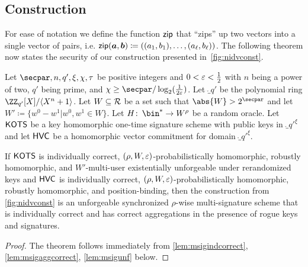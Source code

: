 \subsection{Construction}
For ease of notation we define the function $\mathsf{zip}$ that \enquote{zips} up two vectors into a single vector of pairs, i.e.
$
\mathsf{zip}(\boldsymbol{a},\boldsymbol{b}) \coloneqq ((a_1,b_1),\allowbreak\dots,\allowbreak(a_\ell,b_\ell))
$.
The following theorem now states the security of our construction presented in~\autoref{fig:nidvconst}.
\begin{theorem}\label{thm:mainconstruction}
Let $\secpar,n,q',\xi,\chi,\tau$ be positive integers and $0<\varepsilon < \tfrac{1}{2}$ with $n$ being a power of two, $q'$ being prime, and $\chi \geq \secpar/\log_2(\frac{1}{2\errorbound})$.
Let $\ring_{q'}$ be the polynomial ring $\defringqq$.
Let $W \subseteq \mathcal{R}$ be a set such that $\abs{W} > 2^\secpar$ and let $W' \coloneqq \{w^0-w^1| w^0,w^1 \in W\}$.
Let $H \colon\, \bin^* \to W^\rho$ be a random oracle.
Let $\mathsf{KOTS}$ be a key homomorphic one-time signature scheme with public keys in $\ring_{q'}^\xi$ and let $\mathsf{HVC}$ be a homomorphic vector commitment for domain $\ring_{q'}^\xi$.

If $\mathsf{KOTS}$ is individually correct, $(\rho,W,\varepsilon)$-probabilistically homomorphic, robustly homomorphic, and $W'$-multi-user existentially unforgeable under rerandomized keys and $\mathsf{HVC}$ is individually correct, $(\rho,W,\varepsilon)$-probabilistically homomorphic, robustly homomorphic, and position-binding, then the construction from \autoref{fig:nidvconst} is an unforgeable synchronized $\rho$-wise multi-signature scheme that is individually correct and has correct aggregations in the presence of rogue keys and signatures.
\end{theorem}

\begin{proof}
  The theorem follows immediately from \autoref{lem:msigindcorrect}, \ref{lem:msigaggcorrect}, \ref{lem:msigunf} below.
\end{proof}

